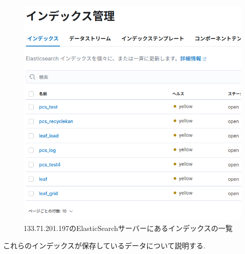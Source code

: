 \begin{figure}[!ht]
    \begin{center}
        \includegraphics[width=160mm]{sotu/figure/indexes.png}
        \caption{133.71.201.197のElasticSearchサーバーにあるインデックスの一覧}
        \label{p15}
    \end{center}
\end{figure}

これらのインデックスが保存しているデータについて説明する.

